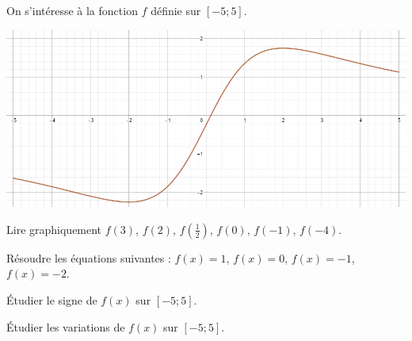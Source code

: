 On s'intéresse à la fonction $f$ définie sur $[-5;5]$.

\begin{center}
	\includegraphics[scale=0.45]{fct2}
\end{center}

\begin{questions}
	
	\question[3] Lire graphiquement $f(3)$, $f(2)$, $f(\frac{1}{2})$, $f(0)$, $f(-1)$, $f(-4)$.
	
	\fillwithdottedlines{2cm}
	
	\question[2] Résoudre les équations suivantes : $f(x)=1$, $f(x)=0$, $f(x)=-1$, $f(x)=-2$.
	
	\fillwithdottedlines{3cm}
	
	\question[3] \'Etudier le signe de $f(x)$ sur $[-5;5]$.
	
	\fillwithdottedlines{3cm}
	
	\question[3] \'Etudier les variations de $f(x)$ sur $[-5;5]$.
	
	\fillwithdottedlines{4cm}
\end{questions}